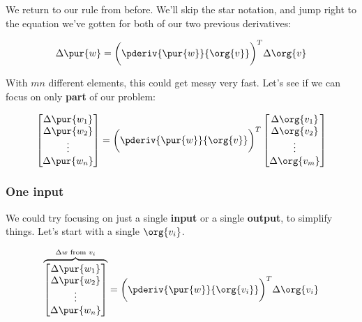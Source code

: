         We return to our rule from before. We'll skip the star notation, and jump right to the equation we've gotten for both of our two previous derivatives:
        
        \begin{equation}
            \Delta \pur{w}
            =
            \bigg(
                \pderiv{ \pur{w} }{ \org{v} } 
            \bigg)^T
            \Delta \org{v}
        \end{equation}
        
        With $mn$ different elements, this could get messy very fast. Let's see if we can focus on only \textbf{part} of our problem:
        
        \begin{equation}
            \begin{bmatrix}
                \Delta \pur{w_1}\\ \Delta \pur{w_2}\\ \vdots \\ \Delta \pur{w_n}
            \end{bmatrix}
            =
            \bigg(
                \pderiv{ \pur{w} }{ \org{v} } 
            \bigg)^T
            \begin{bmatrix}
                \Delta \org{v_1}\\ \Delta \org{v_2}\\ \vdots \\ \Delta \org{v_m}
            \end{bmatrix}
        \end{equation}
    
        \subsubsection*{One input}
        
            We could try focusing on just a single \textbf{input} or a single \textbf{output}, to simplify things. Let's start with a single $\org{v_i}$.
            
            \begin{equation}
                \overbrace{
                    \begin{bmatrix}
                        \Delta \pur{w_1}\\ \Delta \pur{w_2}\\ \vdots \\ \Delta \pur{w_n}
                    \end{bmatrix}
                }^{\Delta w \text{ from } v_i}
                =
                \bigg(
                    \pderiv{ \pur{w} }{ \org{v_i} } 
                \bigg)^T
                \Delta \org{v_i}
            \end{equation}
            

